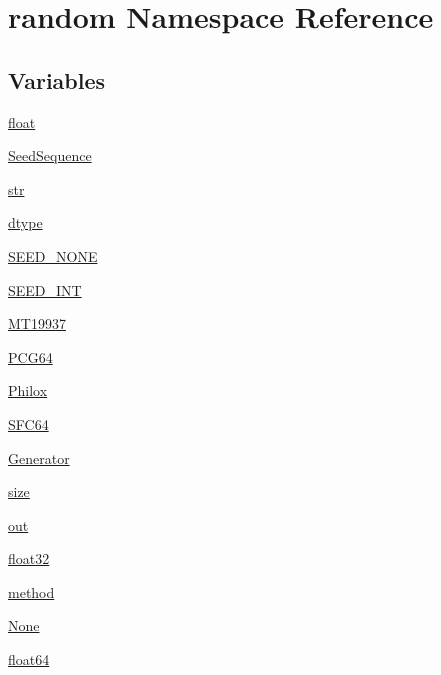 \hypertarget{namespacerandom}{}\section{random Namespace Reference}
\label{namespacerandom}
\subsection*{Variables}
\begin{DoxyCompactItemize}
\item 
\hyperlink{namespacerandom_a24d7bc786472ed6edf956760050d2b3c}{float}
\item 
\hyperlink{namespacerandom_a916bd70bb6cde9793c35279ea0dd2704}{Seed\+Sequence}
\item 
\hyperlink{namespacerandom_ad1153556353e085e79cf1dc02c7c1b5c}{str}
\item 
\hyperlink{namespacerandom_ab74621e0c09bc4d6d88a20ff01feb68e}{dtype}
\item 
\hyperlink{namespacerandom_a662f88afbe88142bde2b7538935a13cf}{S\+E\+E\+D\+\_\+\+N\+O\+NE}
\item 
\hyperlink{namespacerandom_ada7e2024a0d901d2c9970bbd6bdb8c05}{S\+E\+E\+D\+\_\+\+I\+NT}
\item 
\hyperlink{namespacerandom_ab9ff14c48f353593b14635b2aab47cab}{M\+T19937}
\item 
\hyperlink{namespacerandom_a584b1239f01fbac9885f8d1d6d4fa8cf}{P\+C\+G64}
\item 
\hyperlink{namespacerandom_a5c2e524d1d5beaa136ef9f47c3ab079e}{Philox}
\item 
\hyperlink{namespacerandom_a33b5045c09d2e363a49a193a32708883}{S\+F\+C64}
\item 
\hyperlink{namespacerandom_afb5e6a4e770ea0deed2dde590e28c119}{Generator}
\item 
\hyperlink{namespacerandom_a7fb40065754b3b0aa5398d780b953e04}{size}
\item 
\hyperlink{namespacerandom_a0e502efa88a7ed15f4ff067efee00937}{out}
\item 
\hyperlink{namespacerandom_a49f8674fc7defb2776b212f413601fc1}{float32}
\item 
\hyperlink{namespacerandom_afe8c116b77d32f1a8a2799d944e9cfc7}{method}
\item 
\hyperlink{namespacerandom_a1617b0a1c406496cf7ea8f8c6c02b46e}{None}
\item 
\hyperlink{namespacerandom_ad7b3e197ad75f253836fce48be3dd5e1}{float64}
\item 

\end{DoxyCompactItemize}
